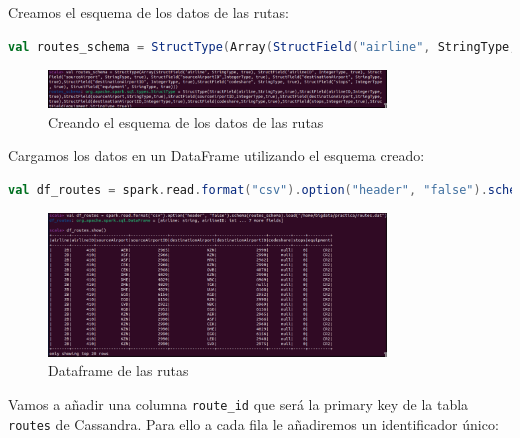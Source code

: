 Creamos el esquema de los datos de las rutas:

\begin{lstlisting}[language=scala]
val routes_schema = StructType(Array(StructField("airline", StringType, true), StructField("airline_id", IntegerType, true), StructField("source_airport", StringType, true), StructField("source_airport_id", IntegerType, true), StructField("destination_airport", StringType, true),StructField("destination_airport_id", IntegerType, true), StructField("codeshare", StringType, true), StructField("stops", IntegerType, true), StructField("equipment", StringType, true)))
\end{lstlisting}

\begin{figure}[H]
    \centering
    \includegraphics[width=0.8\textwidth]{figures/51.png}
    \caption{Creando el esquema de los datos de las rutas}
    \label{fig:create_routes_schema}
\end{figure}

Cargamos los datos en un DataFrame utilizando el esquema creado:

\begin{lstlisting}[language=scala]
val df_routes = spark.read.format("csv").option("header", "false").schema(routes_schema).load("/home/bigdata/practica/routes.dat")
\end{lstlisting}

\begin{figure}[H]
    \centering
    \includegraphics[width=0.8\textwidth]{figures/52.png}
    \caption{Dataframe de las rutas}
    \label{fig:routes_df}
\end{figure}

Vamos a añadir una columna \texttt{route_id} que será la primary key de la tabla \texttt{routes} de Cassandra. Para ello a cada fila le añadiremos un identificador único:

